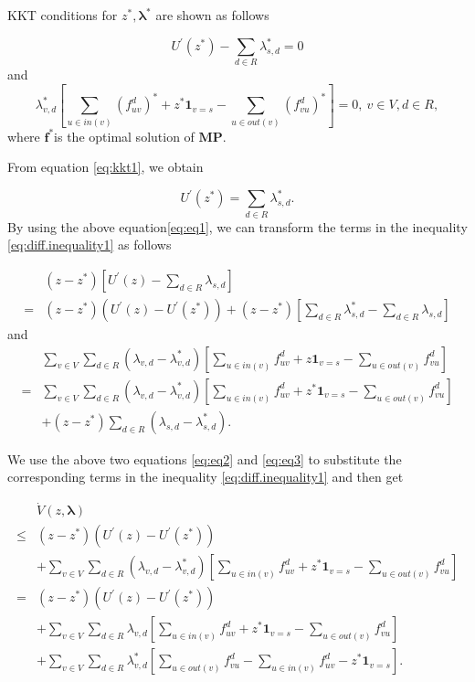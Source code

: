 \documentclass[10pt,conference]{IEEEtran}
\begin{document}
KKT conditions for $z^{*},\boldsymbol{\lambda}^{*}$ are shown as follows

\begin{equation}
U^{'}(z^{*})-\sum_{d\in R}\lambda_{s,d}^{*}=0\label{eq:kkt1}\end{equation}
and
\begin{equation}
\lambda_{v,d}^{*}\left[\sum_{u\in in(v)}(f_{uv}^{d})^{*}+z^{*}\mathbf{1}_{v=s}-\sum_{u\in out(v)}(f_{vu}^{d})^{*}\right]=0,\: v\in V,d\in R\label{eq:kkt2},\end{equation}
where $\boldsymbol{f}^{*}$is the optimal solution of $\mathbf{MP}$.

From equation \eqref{eq:kkt1}, we obtain

\begin{equation}
U^{'}(z^{*})=\sum_{d\in R}\lambda_{s,d}^{*}.\label{eq:eq1}\end{equation}
By using the above equation\eqref{eq:eq1}, we can transform the
terms in the inequality \eqref{eq:diff.inequality1} as follows

\begin{align}
 & (z-z^{*})\left[U^{'}(z)-\sum_{d\in R}\lambda_{s,d}\right]\nonumber \\
= & (z-z^{*})\left(U^{'}(z)-U^{'}(z^{*})\right)+(z-z^{*})\left[\sum_{d\in R}\lambda_{s,d}^{*}-\sum_{d\in R}\lambda_{s,d}\right]\label{eq:eq2}\end{align}
and
\begin{align}
 & \sum_{v\in V}\sum_{d\in R}(\lambda_{v,d}-\lambda_{v,d}^{*})\left[\sum_{u\in in(v)}f_{uv}^{d}+z\mathbf{1}_{v=s}-\sum_{u\in out(v)}f_{vu}^{d}\right]\nonumber \\
= & \sum_{v\in V}\sum_{d\in R}(\lambda_{v,d}-\lambda_{v,d}^{*})\left[\sum_{u\in in(v)}f_{uv}^{d}+z^{*}\mathbf{1}_{v=s}-\sum_{u\in out(v)}f_{vu}^{d}\right]\nonumber \\
 & +(z-z^{*})\sum_{d\in R}(\lambda_{s,d}-\lambda_{s,d}^{*}).\label{eq:eq3}\end{align}


We use the above two equations \eqref{eq:eq2} and \eqref{eq:eq3} to
substitute the corresponding terms in the inequality
\eqref{eq:diff.inequality1} and then get

\begin{align}
 & \dot{V}(z,\boldsymbol{\lambda})\nonumber \\
\leq & (z-z^{*})\left(U^{'}(z)-U^{'}(z^{*})\right)\nonumber \\
 & +\sum_{v\in V}\sum_{d\in R}(\lambda_{v,d}-\lambda_{v,d}^{*})\left[\sum_{u\in in(v)}f_{uv}^{d}+z^{*}\mathbf{1}_{v=s}-\sum_{u\in out(v)}f_{vu}^{d}\right]\nonumber \\
= & (z-z^{*})\left(U^{'}(z)-U^{'}(z^{*})\right)\label{eq:bound1}\\
 & +\sum_{v\in V}\sum_{d\in R}\lambda_{v,d}\left[\sum_{u\in in(v)}f_{uv}^{d}+z^{*}\mathbf{1}_{v=s}-\sum_{u\in out(v)}f_{vu}^{d}\right]\label{eq:bound2}\\
 & +\sum_{v\in V}\sum_{d\in R}\lambda_{v,d}^{*}\left[\sum_{u\in out(v)}f_{vu}^{d}-\sum_{u\in in(v)}f_{uv}^{d}-z^{*}\mathbf{1}_{v=s}\right].\label{eq:bound3}\end{align}
\end{document}
